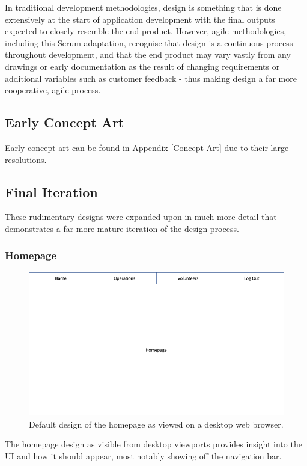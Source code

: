 In traditional development methodologies, design is something that is done extensively at the start of application development with the final outputs expected to closely resemble the end product. However, agile methodologies, including this Scrum adaptation, recognise that design is a continuous process throughout development, and that the end product may vary vastly from any drawings or early documentation as the result of changing requirements or additional variables such as customer feedback - thus making design a far more cooperative, agile process. \cite{Kiss1}

\subsection{Early Concept Art}
Early concept art can be found in Appendix \ref{Concept Art} due to their large resolutions.

\subsection{Final Iteration}
These rudimentary designs were expanded upon in much more detail that demonstrates a far more mature iteration of the design process.

\subsubsection{Homepage}
\begin{figure}[h]
    \includegraphics[width=1.0\textwidth]{Figures/design-homepage}
    \caption{Default design of the homepage as viewed on a desktop web browser.}
    \label{fig:homepage}
\end{figure}

The homepage design as visible from desktop viewports provides insight into the UI and how it should appear, most notably showing off the navigation bar.

